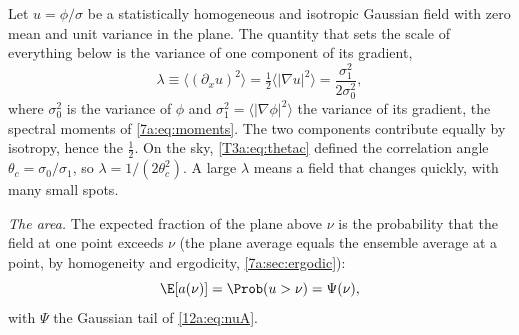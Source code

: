 Let $u=\phi/\sigma$ be a statistically homogeneous and isotropic Gaussian field with zero mean and unit
variance in the plane. The quantity that sets the scale of everything below is the variance of one
component of its gradient,
\begin{equation}
  \lambda\equiv\big\langle(\partial_xu)^2\big\rangle=\tfrac12\big\langle|\nabla u|^2\big\rangle
  =\frac{\sigma_1^2}{2\sigma_0^2},
  \label{12a:eq:lambda}
\end{equation}
where $\sigma_0^2$ is the variance of $\phi$ and $\sigma_1^2=\langle|\nabla\phi|^2\rangle$ the variance of its
gradient, the spectral moments of \eqref{7a:eq:moments}. The two components contribute equally by isotropy,
hence the $\frac12$. On the sky, \eqref{T3a:eq:thetac} defined the correlation angle $\theta_c=\sigma_0/\sigma_1$,
so $\lambda=1/(2\theta_c^2)$. A large $\lambda$ means a field that changes quickly, with many small spots.

\emph{The area.} The expected fraction of the plane above $\nu$ is the probability that the field at one
point exceeds $\nu$ (the plane average equals the ensemble average at a point, by homogeneity and ergodicity,
\cref{7a:sec:ergodic}):
\begin{equation}
  \E[a(\nu)]=\Prob(u>\nu)=\Psi(\nu) ,
  \label{12a:eq:area}
\end{equation}
with $\Psi$ the Gaussian tail of \eqref{12a:eq:nuA}.

